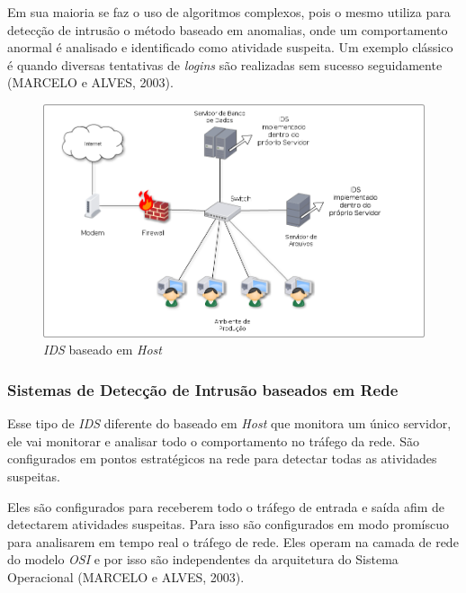 Em sua maioria se faz o uso de algoritmos complexos, pois o mesmo utiliza para detecção de intrusão o método baseado em anomalias, onde um comportamento anormal é analisado e identificado como atividade suspeita. Um exemplo clássico é quando diversas tentativas de \textit{logins} são realizadas sem sucesso seguidamente (MARCELO e ALVES, 2003).

\begin{figure}[!h]
\centering
\includegraphics[width = 15cm]{HOST.png}
\caption{\textit{IDS} baseado em \textit{Host}} 	
\end{figure}

\subsubsection{Sistemas de Detecção de Intrusão baseados em Rede}
Esse tipo de \textit{IDS} diferente do baseado em \textit{Host} que monitora um único servidor, ele vai monitorar e analisar todo o comportamento no tráfego da rede. São configurados em pontos estratégicos na rede para detectar todas as atividades suspeitas. 

Eles são configurados para receberem todo o tráfego de entrada e saída afim de detectarem atividades suspeitas. Para isso são configurados em modo promíscuo para analisarem em tempo real o tráfego de rede. Eles operam na camada de rede do modelo \textit{OSI} e por isso são independentes da arquitetura do Sistema Operacional (MARCELO e ALVES, 2003).

